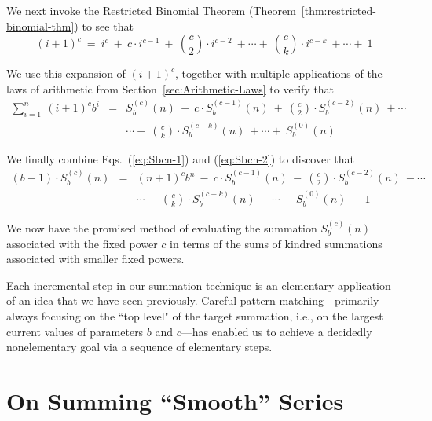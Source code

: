 \smallskip

We next invoke the Restricted Binomial Theorem (Theorem~\ref{thm:restricted-binomial-thm}) to see that
\[ (i+1)^c \ = \ i^c \ + \ c \cdot i^{c-1} \ + \ {c \choose 2} \cdot
i^{c-2} \ + \cdots + \ {c \choose k} \cdot i^{c-k}  \ + \cdots + \ 1
\]

We use this expansion of $(i+1)^c$, together with multiple applications of the laws of arithmetic from Section~\ref{sec:Arithmetic-Laws} to verify that
\begin{eqnarray}
\nonumber
\sum_{i=1}^n \ (i+1)^c b^{i} & = &
S_b^{(c)}(n)
 \ + \ c \cdot S_b^{(c-1)}(n)
 \ + \ {c \choose 2} \cdot S_b^{(c-2)}(n)  \ + \cdots \\
\label{eq:Sbcn-2}
  &  & \cdots + \
{c \choose k} \cdot S_b^{(c-k)}(n)
 \ + \cdots + \
S_b^{(0)}(n)
\end{eqnarray}

\smallskip

%
We finally combine Eqs.~(\ref{eq:Sbcn-1}) and (\ref{eq:Sbcn-2}) to discover that
\begin{eqnarray}
\nonumber
(b-1) \cdot S_b^{(c)}(n)
 & = &
(n+1)^{c} b^{n} \ - \
c \cdot S_b^{(c-1)}(n)
 \ - \ {c \choose 2} \cdot S_b^{(c-2)}(n)  \ - \cdots \\
\label{eq:Sbcn-3}
  &  & 
\cdots - \
{c \choose k} \cdot S_b^{(c-k)}(n)
 \ - \cdots - \
S_b^{(0)}(n)
\ - \ 1
\end{eqnarray}

We now have the promised method of evaluating the summation $S_b^{(c)}(n)$ associated with the fixed power $c$ in terms of the sums of kindred summations associated with smaller fixed powers.

\bigskip

Each incremental step in our summation technique is an elementary application of an idea that we have seen previously.  Careful pattern-matching---primarily always focusing on the ``top level" of the target summation, i.e., on the largest current values of parameters $b$ and $c$---has enabled us to achieve a decidedly nonelementary goal via a sequence of elementary steps.


\section{On Summing ``Smooth'' Series}
\label{sec:smooth-series}

